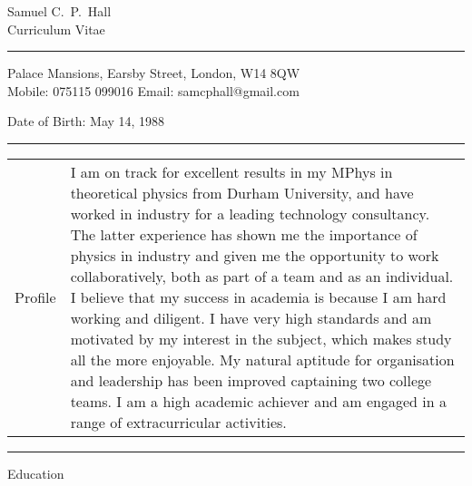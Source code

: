 \begin{center}
	\sc\LARGE Samuel C.~P.~Hall\\
	\large Curriculum Vitae
	\vspace{0.4cm}\hrule
\end{center}

\begin{center}
	 Palace Mansions, Earsby Street, London, W14 8QW\\
	\sc Mobile: 075115 099016\;\;  Email: \rm samcphall@gmail.com

	\sc Date of Birth: May 14, 1988
\end{center}


\vspace{0.2cm}\hrule\vspace{0.2cm}

\begin{tablehere}
  \begin{tabular}{p{\wa\textwidth} p{\wb\textwidth}}
    \sc Profile	&
    I am on track for excellent results in my MPhys in theoretical physics from
    Durham University, and have worked in industry for a leading technology
    consultancy.  The latter experience has shown me the importance of physics in
    industry and given me the opportunity to work collaboratively, both as part of
    a team and as an individual.  I believe that my success in academia is because
    I am hard working and diligent.  I have very high standards and am motivated
    by my interest in the subject, which makes study all the more enjoyable.  My
    natural aptitude for organisation and leadership has been improved captaining
    two college teams.  I am a high academic achiever and am engaged in a range of
    extracurricular activities.
  \end{tabular}
\end{tablehere}


\vspace{0.2cm}\hrule\vspace{0.2cm}
\sc Education \rm

